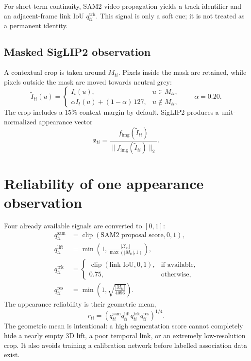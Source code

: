 \documentclass[11pt]{article}
\newcommand{\1}{\bm{1}}
\newcommand{\clip}{\operatorname{clip}}
\begin{document}
For short-term continuity, SAM2 video propagation yields a track identifier and
an adjacent-frame link IoU $q^{\mathrm{trk}}_{ti}$. This signal is only a soft
cue; it is not treated as a permanent identity.

\subsection{Masked SigLIP2 observation}

A contextual crop is taken around $M_{ti}$. Pixels inside the mask are retained,
while pixels outside the mask are moved towards neutral grey:
\begin{equation}
\widetilde I_{ti}(u)=
\begin{cases}
I_t(u), & u\in M_{ti},\\
\alpha I_t(u)+(1-\alpha)\,127, & u\notin M_{ti},
\end{cases}
\qquad \alpha=0.20.
\end{equation}
The crop includes a $15\%$ context margin by default. SigLIP2 produces a
unit-normalized appearance vector
\begin{equation}
\bm{z}_{ti}=\frac{f_{\mathrm{img}}(\widetilde I_{ti})}
{\|f_{\mathrm{img}}(\widetilde I_{ti})\|_2}.
\end{equation}

\section{Reliability of one appearance observation}

Four already available signals are converted to $[0,1]$:
\begin{align}
q^{\mathrm{sam}}_{ti} &= \clip(\text{SAM2 proposal score},0,1),\\
q^{\mathrm{lift}}_{ti} &= \min\left(1,
\frac{|\mathcal{X}_{ti}|}{\max(|M_{ti}|,1)}\right),\\
q^{\mathrm{trk}}_{ti} &=
\begin{cases}
\clip(\text{link IoU},0,1),&\text{if available},\\
0.75,&\text{otherwise},
\end{cases}\\
q^{\mathrm{res}}_{ti} &= \min\left(1,
\sqrt{\frac{|M_{ti}|}{4096}}\right).
\end{align}
The appearance reliability is their geometric mean,
\begin{equation}
r_{ti}=\left(q^{\mathrm{sam}}_{ti}
q^{\mathrm{lift}}_{ti}q^{\mathrm{trk}}_{ti}
q^{\mathrm{res}}_{ti}\right)^{1/4}.
\label{eq:reliability}
\end{equation}
The geometric mean is intentional: a high segmentation score cannot completely
hide a nearly empty 3D lift, a poor temporal link, or an extremely low-resolution
crop. It also avoids training a calibration network before labelled association
data exist.
\end{document}

